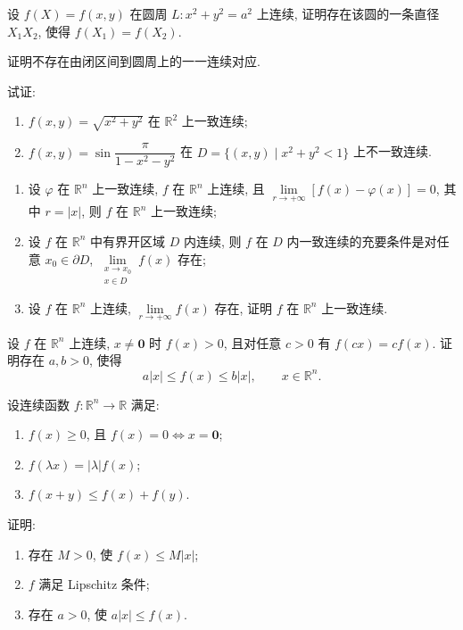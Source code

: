 \documentclass[../数学分析培优讲义.tex]{subfiles}
\begin{document}
\begin{example}
设 $f(X)=f(x,y)$ 在圆周 $L:x^2+y^2=a^2$ 上连续, 证明存在该圆的一条直径 $X_1X_2$, 使得 $f(X_1)=f(X_2)$.
\end{example}
\exampleblank

\begin{example}
证明不存在由闭区间到圆周上的一一连续对应.
\end{example}
\exampleblank

\begin{example}
试证:
\begin{enumerate}[label=(\arabic*)]
    \item $f(x,y)=\sqrt{x^2+y^2}$ 在 $\mathbb{R}^2$ 上一致连续;
    \item $\displaystyle f(x,y)=\sin\dfrac{\pi}{1-x^2-y^2}$ 在 $D=\{(x,y)\mid x^2+y^2<1\}$ 上不一致连续.
\end{enumerate}
\end{example}
\exampleblank

\begin{example}
\begin{enumerate}[label=(\arabic*)]
    \item 设 $\varphi$ 在 $\mathbb{R}^n$ 上一致连续, $f$ 在 $\mathbb{R}^n$ 上连续, 且 $\displaystyle\lim\limits_{r\to+\infty}[f(x)-\varphi(x)]=0$, 其中 $r=|x|$, 则 $f$ 在 $\mathbb{R}^n$ 上一致连续;
    \item 设 $f$ 在 $\mathbb{R}^n$ 中有界开区域 $D$ 内连续, 则 $f$ 在 $D$ 内一致连续的充要条件是对任意 $x_0\in\partial D$, $\displaystyle\lim\limits_{\substack{x\to x_0\\x\in D}}f(x)$ 存在;
    \item 设 $f$ 在 $\mathbb{R}^n$ 上连续, $\displaystyle\lim\limits_{r\to+\infty}f(x)$ 存在, 证明 $f$ 在 $\mathbb{R}^n$ 上一致连续.
\end{enumerate}
\end{example}
\exampleblank

\begin{example}[\markstar]
设 $f$ 在 $\mathbb{R}^n$ 上连续, $x\ne\bm{0}$ 时 $f(x)>0$, 且对任意 $c>0$ 有 $f(cx)=cf(x)$. 证明存在 $a,b>0$, 使得
\[
    a|x|\leq f(x)\leq b|x|,
    \qquad x\in\mathbb{R}^n.
\]
\end{example}
\exampleblank

\begin{example}[\markstar]
设连续函数 $f:\mathbb{R}^n\to\mathbb{R}$ 满足:
\begin{enumerate}[label=(\roman*)]
    \item $f(x)\geq0$, 且 $f(x)=0\iff x=\bm{0}$;
    \item $f(\lambda x)=|\lambda|f(x)$;
    \item $f(x+y)\leq f(x)+f(y)$.
\end{enumerate}
证明:
\begin{enumerate}[label=(\arabic*)]
    \item 存在 $M>0$, 使 $f(x)\leq M|x|$;
    \item $f$ 满足 Lipschitz 条件;
    \item 存在 $a>0$, 使 $a|x|\leq f(x)$.
\end{enumerate}
\end{example}
\exampleblank
\end{document}
